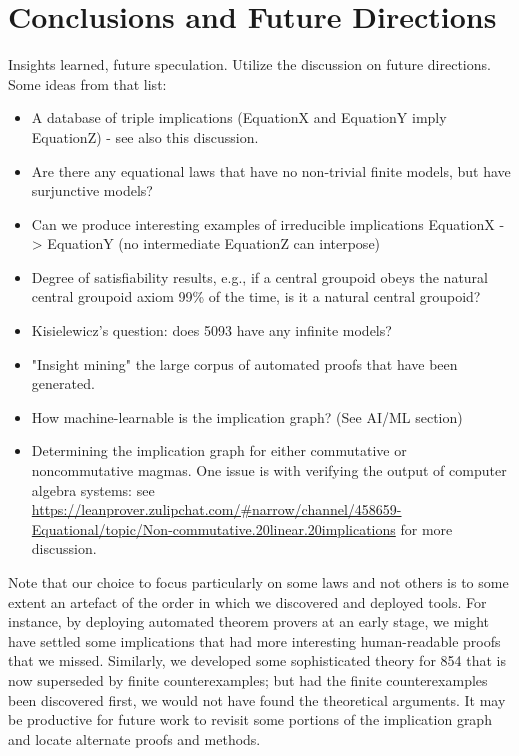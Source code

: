 \section{Conclusions and Future Directions}


Insights learned, future speculation. Utilize the discussion on future directions. Some ideas from that list:

\begin{itemize}
  \item A database of triple implications (EquationX and EquationY imply EquationZ) - see also this discussion.
  \item Are there any equational laws that have no non-trivial finite models, but have surjunctive models?
  \item Can we produce interesting examples of irreducible implications EquationX -> EquationY (no intermediate EquationZ can interpose)
  \item Degree of satisfiability results, e.g., if a central groupoid obeys the natural central groupoid axiom 99\% of the time, is it a natural central groupoid?
  \item Kisielewicz's question: does 5093 have any infinite models?
  \item "Insight mining" the large corpus of automated proofs that have been generated.
  \item How machine-learnable is the implication graph? (See AI/ML section)
  \item Determining the implication graph for either commutative or noncommutative magmas.  One issue is with verifying the output of computer algebra systems: see \url{https://leanprover.zulipchat.com/#narrow/channel/458659-Equational/topic/Non-commutative.20linear.20implications} for more discussion.
\end{itemize}

Note that our choice to focus particularly on some laws and not others is to some extent an artefact of the order in which we discovered and deployed tools.  For instance, by deploying automated theorem provers at an early stage, we might have settled some implications that had more interesting human-readable proofs that we missed.  Similarly, we developed some sophisticated theory for 854 that is now superseded by finite counterexamples; but had the finite counterexamples been discovered first, we would not have found the theoretical arguments.  It may be productive for future work to revisit some portions of the implication graph and locate alternate proofs and methods.


